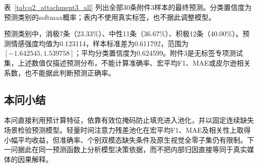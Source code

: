表~\ref{tab:q2_attachment3_all} 列出全部30条附件3样本的最终预测。分类置信度为预测类别的softmax概率；表内不使用真实标签，也不据此调整模型。



预测类别中，消极7条（23.33\%）、中性11条（36.67\%）、积极12条（40.00\%）。预测情感强度均值为0.123114，样本标准差为0.611792，范围为$[-1.642545,1.539758]$；平均分类置信度为0.624599。附件3是无标签专项测试集，上述数值仅描述预测分布，不能计算准确率、宏平均F1、MAE或皮尔逊相关系数，也不能据此判断预测正确率。

\subsection{本问小结}
本问直接利用预计算特征，依靠有效位掩码防止填充进入池化，并以固定连续缺失场景检验预测模型。轻量时间注意力残差池化在宏平均F1、MAE及相关性上取得小幅平均收益，但准确率、个别双模态缺失条件及原生视觉全零子集仍有限制。下一问据此在同一预测函数上分析模型决策依据，而不把内部归因直接等同于真实媒体的因果解释。
\FloatBarrier
